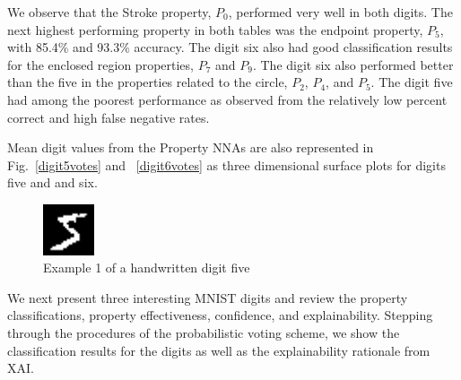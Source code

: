 \documentclass[conference]{IEEEtran}
\begin{document}
We observe that the Stroke property, $P_0$, performed very well in both digits.  The next highest performing property in both tables was the endpoint property, $P_5$, with 85.4\% and 93.3\% accuracy.  The digit six also had good classification results for the enclosed region properties, $P_7$ and $P_9$.  The digit six also performed better than the five in the properties related to the circle, $P_2$, $P_4$, and $P_5$.  The digit five had among the poorest performance as observed from the relatively low percent correct and high false negative rates.

Mean digit values from the Property NNAs are also represented  in Fig.~\ref{digit5votes} and ~\ref{digit6votes} as three dimensional surface plots for digits five and  and six.


 \begin{figure}[htbp]
\centerline{\includegraphics[width=15mm]{./digit-images/5-0.png}}
\caption{Example 1 of a handwritten digit five}
\label{example1}
\end{figure}

We next present three interesting MNIST digits and review the property classifications, property effectiveness,  confidence, and explainability.  Stepping through the procedures of the probabilistic voting scheme, we show the classification results for the digits as well as the explainability rationale from XAI.
\end{document}
